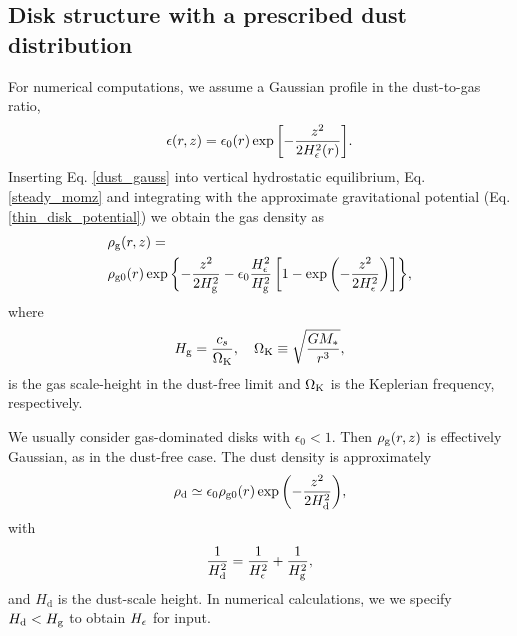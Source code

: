 
\subsection{Disk structure with a prescribed dust distribution}\label{steady_state}  
For numerical computations, we assume a Gaussian profile in the
dust-to-gas ratio,    
\begin{align}\label{dust_gauss}
  \epsilon(r,z) = \epsilon_0(r)
  \exp{\left[-\frac{z^2}{2H_\epsilon^2(r)}\right]}. 
\end{align}
Inserting Eq. \ref{dust_gauss} into vertical hydrostatic equilibrium,
Eq. \ref{steady_momz} and integrating with the approximate
gravitational potential (Eq. \ref{thin_disk_potential}) we obtain the
gas density as
\begin{align}
  &\rho_\mathrm{g}(r,z)= \notag\\
&\rho_\mathrm{g0}(r)\exp{\left\{ - \frac{z^2}{2H_\mathrm{g}^2}
    -\epsilon_0\frac{H_\epsilon^2}{H_\mathrm{g}^2}\left[1 -
      \exp{\left(-\frac{z^2}{2H_\epsilon^2}\right)}\right] \right\}}, 
\end{align}
where
\begin{align}
  H_\mathrm{g} = \frac{c_s}{\Omega_{\rm K}}, \quad \Omega_{\rm K} \equiv \sqrt{\frac{GM_*}{r^3}},   
\end{align}
is the gas scale-height in the dust-free limit and $\Omega_{\rm K}$ is the
Keplerian frequency, respectively. 

We usually consider gas-dominated disks with $\epsilon_0 < 1$.  
Then $\rho_\mathrm{g}(r,z)$ is effectively Gaussian, as in the 
dust-free case. The dust density is approximately 
\begin{align}
  \rho_\mathrm{d} \simeq \epsilon_0\rho_\mathrm{g0}(r) \exp
        {\left(-\frac{z^2}{2H_\mathrm{d}^2}\right)}, 
\end{align}
with 
\begin{align}
  \frac{1}{H_\mathrm{d}^2} = \frac{1}{H_\epsilon^2} + \frac{1}{H_\mathrm{g}^2}, 
\end{align}
and $H_\mathrm{d}$ is the dust-scale height. In numerical
calculations, we  we specify $H_\mathrm{d}< H_\mathrm{g}$ to obtain 
$H_\epsilon$ for input. 

